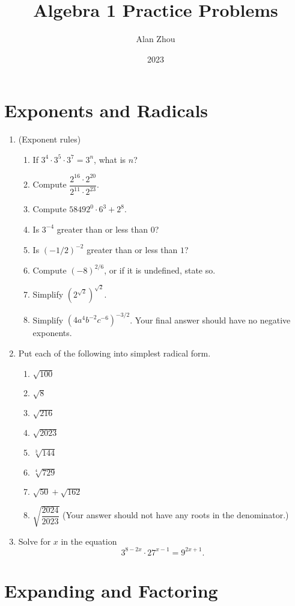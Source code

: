 \documentclass{article}
\title{Algebra 1 Practice Problems}
\author{Alan Zhou}
\date{2023}
\begin{document}
\maketitle

\section{Exponents and Radicals}

\begin{enumerate}
\item (Exponent rules)
\begin{enumerate}
\item If $3^4\cdot 3^5\cdot 3^7 = 3^n$, what is $n$?
\item Compute $\dfrac{2^{16}\cdot 2^{20}}{2^{11}\cdot 2^{23}}$.
\item Compute $58492^0\cdot 6^3 + 2^8$.
\item Is $3^{-4}$ greater than or less than $0$?
\item Is $(-1/2)^{-2}$ greater than or less than $1$?
\item Compute $(-8)^{2/6}$, or if it is undefined, state so.
\item Simplify $\left(2^{\sqrt{2}}\right)^{\sqrt{2}}$.
\item Simplify $(4a^4b^{-2}c^{-6})^{-3/2}$. Your final answer should have no negative exponents.
\end{enumerate}
\item Put each of the following into simplest radical form.
\begin{enumerate}
\item $\sqrt{100}$
\item $\sqrt{8}$
\item $\sqrt{216}$
\item $\sqrt{2023}$
\item $\sqrt[3]{144}$
\item $\sqrt[4]{729}$
\item $\sqrt{50} + \sqrt{162}$
\item $\sqrt{\dfrac{2024}{2023}}$ (Your answer should not have any roots in the denominator.)
\end{enumerate}
\item Solve for $x$ in the equation
\begin{equation*}
3^{8 - 2x}\cdot 27^{x - 1} = 9^{2x + 1}.
\end{equation*}
\end{enumerate}

\newpage
\section{Expanding and Factoring}
\end{document}

